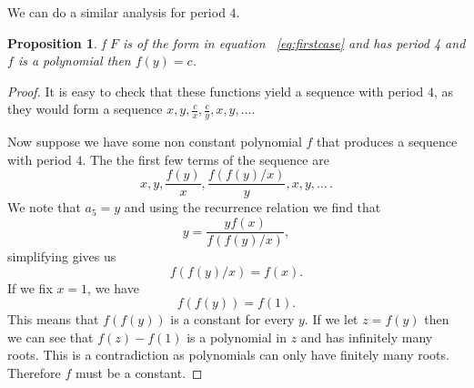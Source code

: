 \documentclass[12pt]{article}
\newtheorem{proposition}{Proposition}
\begin{document}
We can do a similar analysis for period $4$.
\begin{proposition}
f $F$ is of the form in equation ~\ref{eq:firstcase} and has period 4 and $f$ is a polynomial then $f(y) = c$. 
\end{proposition}

\begin{proof}
It is easy to check that these functions yield a sequence with period $4$, as they would form a sequence $x,y, \frac{c}{x}, \frac{c}{y}, x, y, \ldots$. 

Now suppose we have some non constant polynomial  $f$ that produces a sequence with period $4$. The  the first few terms of the sequence are 
\begin{equation*}
x, y, \dfrac{f(y)}{x}, \dfrac{f(f(y)/x)}{y}, x, y, \dots \, .
\end{equation*}
We note that $a_5 =y$ and using the recurrence relation we find that 
\begin{equation*}
 y = \dfrac{yf(x)}{f(f(y)/x)}, 
 \end{equation*}
simplifying gives us  
\begin{equation*}
 f(f(y)/x) = f(x).
\end{equation*}
If we fix $x = 1$, we have
\begin{equation*}
f(f(y)) = f(1). 
\end{equation*}
This means that $f(f(y))$ is a constant for every $y$. If we let $z=f(y)$ then we can see that $f(z)-f(1)$ is a polynomial in $z$ and has infinitely many roots. This is a contradiction as polynomials can only have finitely many roots. Therefore $f$ must be a constant. 
\end{proof}
\end{document}
